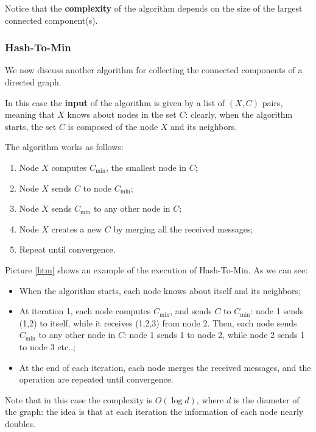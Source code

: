 Notice that the \textbf{complexity} of the algorithm depends on the size of the largest connected component(s).

\subsubsection{Hash-To-Min}
We now discuss another algorithm for collecting the connected components of a directed graph.

In this case the \textbf{input} of the algorithm is given by a list of $(X,C)$ pairs, meaning that $X$ knows about nodes in the set $C$: clearly, when the algorithm starts, the set $C$ is composed of the node $X$ and its neighbors.

The algorithm works as follows:

\begin{enumerate}
    \item Node $X$ computes $C_{\text{min}}$, the smallest node in $C$;
    \item Node $X$ sends $C$ to node $C_{\text{min}}$;
    \item Node $X$ sends $C_{\text{min}}$ to any other node in $C$;
    \item Node $X$ creates a new $C$ by merging all the received messages;
    \item Repeat until convergence.
\end{enumerate}

Picture \ref{htm} shows an example of the execution of Hash-To-Min. As we can see:

\begin{itemize}
    \item When the algorithm starts, each node knows about itself and its neighbors;
    \item At iteration 1, each node computes $C_{\text{min}}$, and sends $C$ to $C_{\text{min}}$: node 1 sends (1,2) to itself, while it receives (1,2,3) from node 2. Then, each node sends $C_{\text{min}}$ to any other node in $C$: node 1 sends 1 to node 2, while node 2 sends 1 to node 3 etc..;
    \item At the end of each iteration, each node merges the received messages, and the operation are repeated until convergence.
\end{itemize}

Note that in this case the complexity is $O(\log d)$, where $d$ is the diameter of the graph: the idea is that at each iteration the information of each node nearly doubles.

